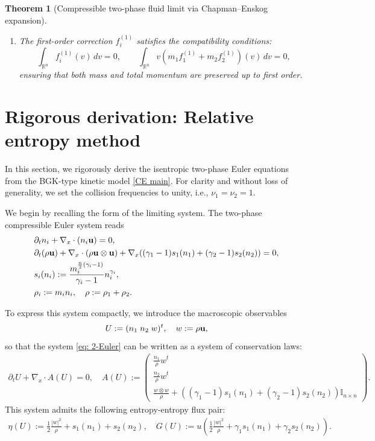\documentclass[10pt,reqno]{amsart}
\numberwithin{equation}{section}
\newtheorem{theorem}{Theorem}[section]
\newcommand{\p}{\partial}
\begin{document}
\begin{theorem}[Compressible two-phase fluid limit via Chapman--Enskog expansion]
\begin{enumerate}
    \item[(iii)] The first-order correction $f_i^{(1)}$ satisfies the compatibility conditions:
    \[
    \int_{\mathbb{R}^n} f_i^{(1)}(v)\,dv = 0, \qquad
    \int_{\mathbb{R}^n} v \left( m_1 f_1^{(1)} + m_2 f_2^{(1)} \right)(v) \, dv = 0,
    \]
    ensuring that both mass and total momentum are preserved up to first order.
\end{enumerate}
\end{theorem}


\section{Rigorous derivation: Relative entropy method}\label{sec_re}

In this section, we rigorously derive the isentropic two-phase Euler equations from the BGK-type kinetic model \eqref{CE main}. For clarity and without loss of generality, we set the collision frequencies to unity, i.e., $\nu_1 = \nu_2 = 1$.

We begin by recalling the form of the limiting system. The two-phase compressible Euler system reads
\begin{equation}\label{eq: 2-Euler}
\begin{split}
    &\p_t n_i + \nabla_x \cdot (n_i {\bf{u}}) = 0,\\
    &\p_t (\rho {\bf{u}}) + \nabla_x\cdot (\rho {\bf{u}}\otimes {\bf{u}}) + \nabla_x((\gamma_1-1) s_1(n_1) + (\gamma_2 - 1) s_2(n_2)) = 0,\\
    &s_i(n_i) := \frac{m_i^{\frac{n}{2}(\gamma_i - 1)}}{\gamma_i - 1} n_i^{\gamma_i},\\
    &\rho_i := m_i n_i, \quad  \rho := \rho_1 + \rho_2.
\end{split}
\end{equation}

To express this system compactly, we introduce the macroscopic observables
\[
    U := (n_1 \; n_2 \; w)^t, \quad w := \rho {\bf{u}} ,
\]
so that the system \eqref{eq: 2-Euler} can be written as a system of conservation laws:
\begin{align*}
    \p_t U + \nabla_x \cdot A(U) = 0, \quad A(U) := \begin{pmatrix}
        \frac{n_1}{\rho} w^t \\[6pt]
        \frac{n_2}{\rho}w^t \\[6pt]
        \frac{w\otimes w}{\rho} + ((\gamma_1-1)s_1(n_1) + (\gamma_2-1)s_2(n_2)) \mathbb{I}_{n\times n}
    \end{pmatrix}.
\end{align*}
This system admits the following entropy-entropy flux pair:
\begin{align*}
    \eta(U) := \frac{1}{2} \frac{|w|^2}{\rho} + s_1(n_1) + s_2(n_2),  \quad G(U) := u \left(\frac{1}{2}\frac{|w|^2}{\rho} + \gamma_1 s_1(n_1) + \gamma_2 s_2(n_2) \right).
\end{align*}
\end{document}
